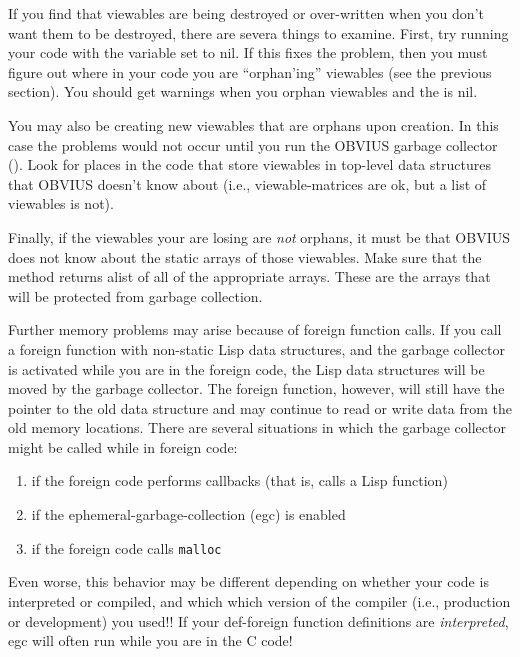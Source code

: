 If you find that viewables are being destroyed or over-written when
you don't want them to be destroyed, there are severa things to
examine.  First, try running your code with the variable
 set to nil.  If this fixes the problem,
then you must figure out where in your code you are ``orphan'ing''
viewables (see the previous section).  You should get warnings when
you orphan viewables and the  is nil.

You may also be creating new viewables that are orphans upon creation.
In this case the problems would not occur until you run the OBVIUS
garbage collector ().  Look for places in the code that
store viewables in top-level data structures that OBVIUS doesn't know
about (i.e., viewable-matrices are ok, but a list of viewables is
not).

Finally, if the viewables your are losing are {\em not} orphans, it
must be that OBVIUS does not know about the static arrays of those
viewables.  Make sure that the  method returns
alist of all of the appropriate arrays.  These are the arrays that
will be protected from garbage collection.

Further memory problems may arise because of foreign function calls.
If you call a foreign function with non-static Lisp data structures,
and the garbage collector is activated while you are in the foreign
code, the Lisp data structures will be moved by the garbage collector.
The foreign function, however, will still have the pointer to the old
data structure and may continue to read or write data from the old
memory locations.
There are several situations in which the garbage collector might be
called while in foreign code:
\begin{enumerate}
\item if the foreign code performs callbacks (that is, calls a Lisp
function)
\item if the ephemeral-garbage-collection (egc) is enabled
\item if the foreign code calls {\tt malloc}
\end{enumerate}
Even worse, this behavior may be different depending on whether your
code is interpreted or compiled, and which which version of the
compiler (i.e., production or development) you used!!  If your
def-foreign function definitions are {\em interpreted}, egc will often
run while you are in the C code!

